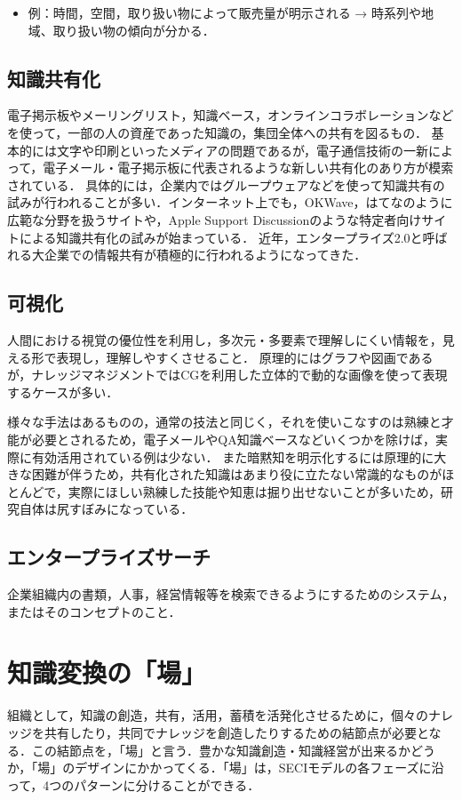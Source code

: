 \begin{itemize}
  \item 例：時間，空間，取り扱い物によって販売量が明示される → 時系列や地域、取り扱い物の傾向が分かる\cite{management}．
\end{itemize}

\subsection{知識共有化}
電子掲示板やメーリングリスト，知識ベース，オンラインコラボレーションなどを使って，一部の人の資産であった知識の，集団全体への共有を図るもの．
基本的には文字や印刷といったメディアの問題であるが，電子通信技術の一新によって，電子メール・電子掲示板に代表されるような新しい共有化のあり方が模索されている．
具体的には，企業内ではグループウェアなどを使って知識共有の試みが行われることが多い．インターネット上でも，OKWave，はてなのように広範な分野を扱うサイトや，Apple Support Discussionのような特定者向けサイトによる知識共有化の試みが始まっている．
近年，エンタープライズ2.0と呼ばれる大企業での情報共有が積極的に行われるようになってきた\cite{management}．


\subsection{可視化}
人間における視覚の優位性を利用し，多次元・多要素で理解しにくい情報を，見える形で表現し，理解しやすくさせること．
原理的にはグラフや図画であるが，ナレッジマネジメントではCGを利用した立体的で動的な画像を使って表現するケースが多い．


様々な手法はあるものの，通常の技法と同じく，それを使いこなすのは熟練と才能が必要とされるため，電子メールやQA知識ベースなどいくつかを除けば，実際に有効活用されている例は少ない．
また暗黙知を明示化するには原理的に大きな困難が伴うため，共有化された知識はあまり役に立たない常識的なものがほとんどで，実際にほしい熟練した技能や知恵は掘り出せないことが多いため，研究自体は尻すぼみになっている\cite{management}．

\subsection{エンタープライズサーチ}
企業組織内の書類，人事，経営情報等を検索できるようにするためのシステム，またはそのコンセプトのこと\cite{management}．


\section{知識変換の「場」}
組織として，知識の創造，共有，活用，蓄積を活発化させるために，個々のナレッジを共有したり，共同でナレッジを創造したりするための結節点が必要となる．この結節点を，「場」と言う．豊かな知識創造・知識経営が出来るかどうか，「場」のデザインにかかってくる．「場」は，SECIモデルの各フェーズに沿って，4つのパターンに分けることができる\cite{ba}．


